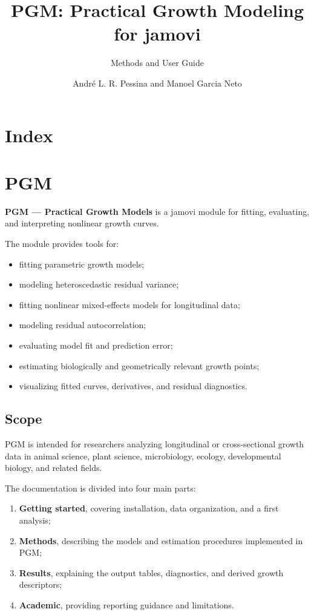 \documentclass[
  english,
  letterpaper,
  DIV=11,
  numbers=noendperiod]{scrreprt}
\title{PGM: Practical Growth Modeling for jamovi}
\subtitle{Methods and User Guide}
\author{André L. R. Pessina and Manoel Garcia Neto}
\date{}
\providecommand{\tightlist}{%
  \setlength{\itemsep}{0pt}\setlength{\parskip}{0pt}}
\renewcommand*\contentsname{Table of contents}
\newcommand\contentsname{Table of contents}
\begin{document}
\maketitle

\renewcommand*\contentsname{Table of contents}
{
\setcounter{tocdepth}{2}
\tableofcontents
}


\chapter{Index}\label{index}


\chapter{PGM}\label{pgm}

\textbf{PGM --- Practical Growth Models} is a jamovi module for fitting,
evaluating, and interpreting nonlinear growth curves.

The module provides tools for:

\begin{itemize}
\tightlist
\item
  fitting parametric growth models;
\item
  modeling heteroscedastic residual variance;
\item
  fitting nonlinear mixed-effects models for longitudinal data;
\item
  modeling residual autocorrelation;
\item
  evaluating model fit and prediction error;
\item
  estimating biologically and geometrically relevant growth points;
\item
  visualizing fitted curves, derivatives, and residual diagnostics.
\end{itemize}

\section{Scope}\label{scope}

PGM is intended for researchers analyzing longitudinal or
cross-sectional growth data in animal science, plant science,
microbiology, ecology, developmental biology, and related fields.

The documentation is divided into four main parts:

\begin{enumerate}
\def\labelenumi{\arabic{enumi}.}
\tightlist
\item
  \textbf{Getting started}, covering installation, data organization,
  and a first analysis;
\item
  \textbf{Methods}, describing the models and estimation procedures
  implemented in PGM;
\item
  \textbf{Results}, explaining the output tables, diagnostics, and
  derived growth descriptors;
\item
  \textbf{Academic}, providing reporting guidance and limitations.
\end{enumerate}
\end{document}
